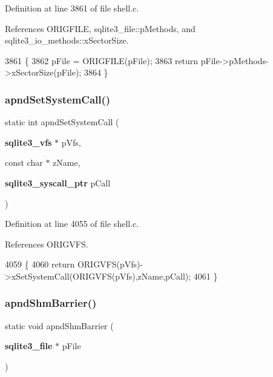 Definition at line 3861 of file shell.\+c.



References O\+R\+I\+G\+F\+I\+LE, sqlite3\+\_\+file\+::p\+Methods, and sqlite3\+\_\+io\+\_\+methods\+::x\+Sector\+Size.


\begin{DoxyCode}
3861                                               \{
3862   pFile = ORIGFILE(pFile);
3863   \textcolor{keywordflow}{return} pFile->pMethods->xSectorSize(pFile);
3864 \}
\end{DoxyCode}
\mbox{\label{shell_8c_a797948d0e8d9f7fbf55e81fe616091eb}} 
\subsubsection{apnd\+Set\+System\+Call()}
{\footnotesize\ttfamily static int apnd\+Set\+System\+Call (\begin{DoxyParamCaption}\item[{\textbf{ sqlite3\+\_\+vfs} $\ast$}]{p\+Vfs,  }\item[{const char $\ast$}]{z\+Name,  }\item[{\textbf{ sqlite3\+\_\+syscall\+\_\+ptr}}]{p\+Call }\end{DoxyParamCaption})\hspace{0.3cm}{\ttfamily [static]}}



Definition at line 4055 of file shell.\+c.



References O\+R\+I\+G\+V\+FS.


\begin{DoxyCode}
4059  \{
4060   \textcolor{keywordflow}{return} ORIGVFS(pVfs)->xSetSystemCall(ORIGVFS(pVfs),zName,pCall);
4061 \}
\end{DoxyCode}
\mbox{\label{shell_8c_a2850053c07d3e73802a64c392a5cc505}} 
\subsubsection{apnd\+Shm\+Barrier()}
{\footnotesize\ttfamily static void apnd\+Shm\+Barrier (\begin{DoxyParamCaption}\item[{\textbf{ sqlite3\+\_\+file} $\ast$}]{p\+File }\end{DoxyParamCaption})\hspace{0.3cm}{\ttfamily [static]}}



